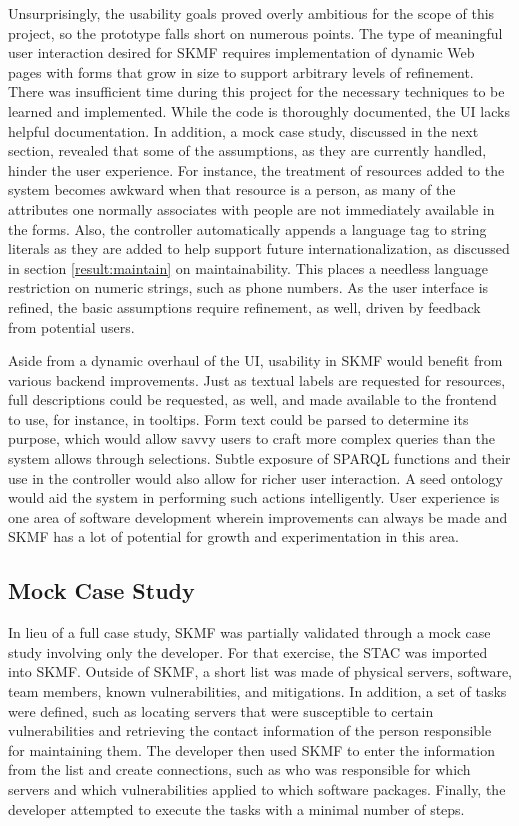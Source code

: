 Unsurprisingly, the usability goals proved overly ambitious for the scope of this project, so the prototype falls short on numerous points. The type of meaningful user interaction desired for SKMF requires implementation of dynamic Web pages with forms that grow in size to support arbitrary levels of refinement. There was insufficient time during this project for the necessary techniques to be learned and implemented. While the code is thoroughly documented, the UI lacks helpful documentation. In addition, a mock case study, discussed in the next section, revealed that some of the assumptions, as they are currently handled, hinder the user experience. For instance, the treatment of resources added to the system becomes awkward when that resource is a person, as many of the attributes one normally associates with people are not immediately available in the forms. Also, the controller automatically appends a language tag to string literals as they are added to help support future internationalization, as discussed in section
\ref{result:maintain}
on maintainability. This places a needless language restriction on numeric strings, such as phone numbers. As the user interface is refined, the basic assumptions require refinement, as well, driven by feedback from potential users.

Aside from a dynamic overhaul of the UI, usability in SKMF would benefit from various backend improvements. Just as textual labels are requested for resources, full descriptions could be requested, as well, and made available to the frontend to use, for instance, in tooltips. Form text could be parsed to determine its purpose, which would allow savvy users to craft more complex queries than the system allows through selections. Subtle exposure of SPARQL functions and their use in the controller would also allow for richer user interaction. A seed ontology would aid the system in performing such actions intelligently. User experience is one area of software development wherein improvements can always be made and SKMF has a lot of potential for growth and experimentation in this area.


\subsection{Mock Case Study}
\label{result:case-study}

In lieu of a full case study, SKMF was partially validated through a mock case study involving only the developer. For that exercise, the STAC
\cite{ontosec}
was imported into SKMF. Outside of SKMF, a short list was made of physical servers, software, team members, known vulnerabilities, and mitigations. In addition, a set of tasks were defined, such as locating servers that were susceptible to certain vulnerabilities and retrieving the contact information of the person responsible for maintaining them. The developer then used SKMF to enter the information from the list and create connections, such as who was responsible for which servers and which vulnerabilities applied to which software packages. Finally, the developer attempted to execute the tasks with a minimal number of steps.

